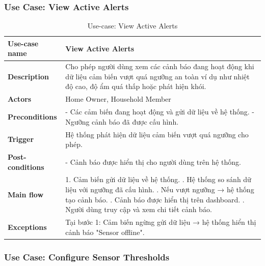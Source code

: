 \documentclass[a4paper,twoside]{article}
\begin{document}
\subsubsection{Use Case: View Active Alerts}
\begin{table}[H]
\centering
\begin{tabular}{|p{4cm}|p{11cm}|}
\hline
\textbf{Use-case name} & View Active Alerts \\ \hline

\textbf{Description} &
Cho phép người dùng xem các cảnh báo đang hoạt động
khi dữ liệu cảm biến vượt quá ngưỡng an toàn
ví dụ như nhiệt độ cao, độ ẩm quá thấp hoặc phát hiện khói. \\ \hline

\textbf{Actors} &
Home Owner, Household Member \\ \hline

\textbf{Preconditions} &
- Các cảm biến đang hoạt động và gửi dữ liệu về hệ thống. \newline
- Ngưỡng cảnh báo đã được cấu hình. \\ \hline

\textbf{Trigger} &
Hệ thống phát hiện dữ liệu cảm biến vượt quá ngưỡng cho phép. \\ \hline

\textbf{Post-conditions} &
- Cảnh báo được hiển thị cho người dùng trên hệ thống. \\ \hline

\textbf{Main flow} &
1. Cảm biến gửi dữ liệu về hệ thống. \newline
2. Hệ thống so sánh dữ liệu với ngưỡng đã cấu hình. \newline
3. Nếu vượt ngưỡng → hệ thống tạo cảnh báo. \newline
4. Cảnh báo được hiển thị trên dashboard. \newline
5. Người dùng truy cập và xem chi tiết cảnh báo. \\ \hline

\textbf{Exceptions} &
Tại bước 1: Cảm biến ngừng gửi dữ liệu → hệ thống hiển thị cảnh báo "Sensor offline". \\ \hline
\end{tabular}
\caption{Use-case: View Active Alerts}
\end{table}


\subsubsection{Use Case: Configure Sensor Thresholds}
\end{document}
